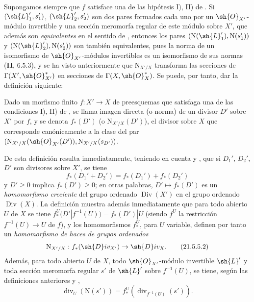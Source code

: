 \begin{env}[21.5.4]
\label{IV.21.5.4}
Supongamos siempre que $f$ satisface una de las hipótesis I), II) de .
Si $(\sh{L}_1',s_1')$, $(\sh{L}_2',s_2')$ son dos pares formados cada uno por un $\sh{O}_{X'}$-módulo invertible y una sección meromorfa regular de este módulo sobre $X'$, que además son \emph{equivalentes} en el sentido de , entonces los pares $(\mathrm{N}(\sh{L}_1'),\mathrm{N}(s_1'))$ y $(\mathrm{N}(\sh{L}_2'),\mathrm{N}(s_2'))$ son también equivalentes, pues la norma de un isomorfismo de $\sh{O}_{X'}$-módulos invertibles es un isomorfismo de sus normas (\textbf{II}, 6.5.3), y se ha visto anteriormente que $\mathrm{N}_{X'/X}$ transforma las secciones de $\Gamma(X',\sh{O}_{X'}^*)$ en secciones de $\Gamma(X,\sh{O}_X^*)$.
Se puede, por tanto, dar la definición siguiente:
\end{env}


\begin{definition}[21.5.5]
\label{IV.21.5.5}
Dado un morfismo finito $f:X'\to X$ de preesquemas que satisfaga una de las condiciones \textup{I), II)} de , se llama imagen directa (o norma) de un divisor $D'$ sobre $X'$ por $f$, y se denota $f_*(D')$ \textup{(}o $\mathrm{N}_{X'/X}(D')$\textup{)}, el divisor sobre $X$ que corresponde canónicamente  a la clase del par $(\mathrm{N}_{X'/X}(\sh{O}_{X'}(D')),\mathrm{N}_{X'/X}(s_{D'}))$.
\end{definition}

De esta definición resulta inmediatamente, teniendo en cuenta  y , que si $D_1'$, $D_2'$, $D'$ son divisores sobre $X'$, se tiene
\[
\label{IV.21.5.5.1}
  f_*(D_1'+D_2')=f_*(D_1')+f_*(D_2')
  \tag{21.5.5.1}
\]
y $D'\geq0$ implica $f_*(D')\geq0$; en otras palabras, $D'\mapsto f_*(D')$ es un \emph{homomorfismo creciente} del grupo ordenado $\operatorname{Div}(X')$ en el grupo ordenado $\operatorname{Div}(X)$.
La definición  muestra además inmediatamente que para todo abierto $U$ de $X$ se tiene $f_*^U(D'|f^{-1}(U))=f_*(D')|U$ (siendo $f^U$ la restricción $f^{-1}(U)\to U$ de $f$), y los homomorfismos $f_*^U$, para $U$ variable, definen por tanto un \emph{homomorfismo de haces de grupos ordenados}
\[
\label{IV.21.5.5.2}
  \mathrm{N}_{X'/X}:f_*(\sh{D}iv_{X'})\to\sh{D}iv_X.
  \tag{21.5.5.2}
\]
Además, para todo abierto $U$ de $X$, todo $\sh{O}_{X'}$-módulo invertible $\sh{L}'$ y toda sección meromorfa regular $s'$ de $\sh{L}'$ sobre $f^{-1}(U)$, se tiene, según las definiciones anteriores y ,
\[
\label{IV.21.5.5.3}
  \operatorname{div}_U(\mathrm{N}(s'))=f_*^U(\operatorname{div}_{f^{-1}(U)}(s')).
  \tag{21.5.5.3}
\]

